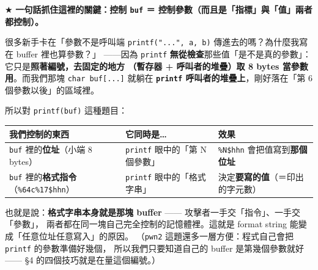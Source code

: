 \documentclass[10pt,a4paper]{article}
\newcounter{none}
\renewenvironment{quote}{%
  \begin{mdframed}[linewidth=0pt,innerleftmargin=0pt,innerrightmargin=0pt,
    innerbottommargin=0pt,innertopmargin=0pt,skipabove=0.55em,skipbelow=0.55em,
    leftmargin=0.9em,rightmargin=0.4em,startcode={\color{quotebar}\vrule width 2.6pt},%
    endcode={}]%
  \itshape\color{black}%
}{%
  \end{mdframed}%
}
\begin{document}
\begin{quote}
★ \textbf{一句話抓住這裡的關鍵：控制 \texttt{buf} ＝
控制參數（而且是「指標」與「值」兩者都控制）。}

很多新手卡在「參數不是呼叫端 \texttt{printf("...",\allowbreak{}\ \allowbreak{}a,\allowbreak{}\ \allowbreak{}b)}
傳進去的嗎？為什麼我寫在 buffer 裡也算參數？」 ------因為
\texttt{printf}
\textbf{無從檢查}那些值「是不是真的參數」：它只是\textbf{照著編號，去固定的地方
（暫存器 + 呼叫者的堆疊）取 8 bytes 當參數用}。而我們那塊
\texttt{char\ \allowbreak{}buf{[}...{]}} 就躺在 \textbf{\texttt{printf}
呼叫者的堆疊上}，剛好落在「第 6 個參數以後」的區域裡。

所以對 \texttt{printf(buf)} 這種題目：

{\def\LTcaptype{none} %
\begin{longtable}[]{@{}
  >{\raggedright\arraybackslash}p{}
  >{\raggedright\arraybackslash}p{}
  >{\raggedright\arraybackslash}p{}@{}}
\toprule\noalign{}
\begin{minipage}[b]{\linewidth}\raggedright
我們控制的東西
\end{minipage} & \begin{minipage}[b]{\linewidth}\raggedright
它同時是\ldots{}
\end{minipage} & \begin{minipage}[b]{\linewidth}\raggedright
效果
\end{minipage} \\
\midrule\noalign{}
\endhead
\bottomrule\noalign{}
\endlastfoot
\texttt{buf} 裡的\textbf{位址}（小端 8 bytes） & \texttt{printf}
眼中的「第 N 個參數」 & \texttt{\%\allowbreak{}N\$\allowbreak{}hhn} 會把值寫到\textbf{那個位址} \\
\texttt{buf} 裡的\textbf{格式指令}（\texttt{\%\allowbreak{}64c\%\allowbreak{}17\$\allowbreak{}hhn}） &
\texttt{printf} 眼中的「格式字串」 &
決定\textbf{要寫的值}（＝印出的字元數） \\
\end{longtable}
}

也就是說：\textbf{格式字串本身就是那塊 buffer} ------
攻擊者一手交「指令」、一手交「參數」，
兩者都在同一塊自己完全控制的記憶體裡。這就是 format string
能變成「任意位址任意寫入」的原因。 （\texttt{pwn2}
這題還多一層方便：程式自己會把 \texttt{printf} 的參數準備好幾個，
所以我們只要知道自己的 buffer 是第幾個參數就好 ------ §4
的四個技巧就是在量這個編號。）
\end{quote}
\end{document}
